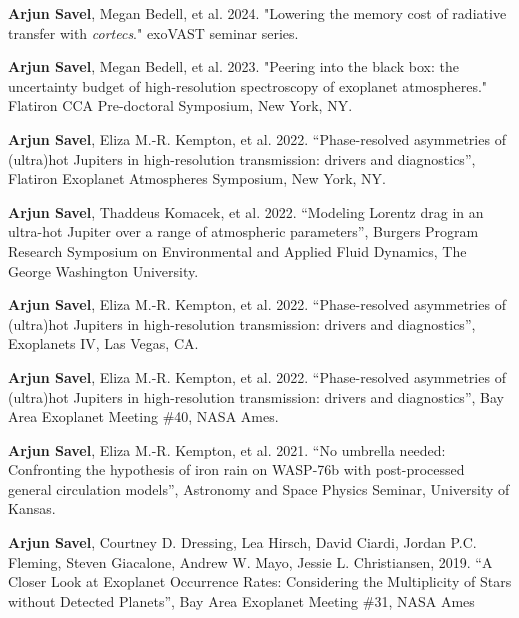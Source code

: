 \documentclass[letterpaper,10.5pt]{article}
\begin{document}
\begin{list}{}{\cvlist}
  \item[{\color{numcolor}\scriptsize10}] \textbf{Arjun Savel}, Megan Bedell, et al. 2024. "Lowering the memory cost of radiative transfer with \textit{cortecs}." exoVAST seminar series.
  

  \item[{\color{numcolor}\scriptsize9}] \textbf{Arjun Savel}, Megan Bedell, et al. 2023. "Peering into the black box: 
the uncertainty budget of high-resolution spectroscopy of exoplanet atmospheres." Flatiron CCA Pre-doctoral Symposium, New York, NY.

 \item[{\color{numcolor}\scriptsize8}] \textbf{Arjun Savel}, Eliza M.-R. Kempton, et al. 2022. ``Phase-resolved asymmetries of (ultra)hot Jupiters in high-resolution transmission: drivers and diagnostics'', Flatiron Exoplanet Atmospheres Symposium, New York, NY.

\item[{\color{numcolor}\scriptsize7}] \textbf{Arjun Savel}, Thaddeus Komacek, et al. 2022. ``Modeling Lorentz drag in an ultra-hot Jupiter over a range of atmospheric parameters'', Burgers Program Research Symposium on Environmental and Applied Fluid Dynamics, The George Washington University.

     \item[{\color{numcolor}\scriptsize6}] \textbf{Arjun Savel}, Eliza M.-R. Kempton, et al. 2022. ``Phase-resolved asymmetries of (ultra)hot Jupiters in high-resolution transmission: drivers and diagnostics'', Exoplanets IV, Las Vegas, CA.


   \item[{\color{numcolor}\scriptsize5}] \textbf{Arjun Savel}, Eliza M.-R. Kempton, et al. 2022. ``Phase-resolved asymmetries of (ultra)hot Jupiters in high-resolution transmission: drivers and diagnostics'', Bay Area Exoplanet Meeting \#40, NASA Ames.


\item[{\color{numcolor}\scriptsize4}] \textbf{Arjun Savel}, Eliza M.-R. Kempton, et al. 2021. ``No umbrella needed: Confronting the hypothesis of iron rain on WASP-76b with post-processed general circulation models'', Astronomy and Space Physics Seminar, University of Kansas.



\item[{\color{numcolor}\scriptsize3}] \textbf{Arjun Savel}, Courtney D. Dressing, Lea Hirsch, David Ciardi, Jordan P.C. Fleming, Steven Giacalone, Andrew W. Mayo, Jessie L. Christiansen, 2019. “A Closer Look at Exoplanet Occurrence Rates: Considering the Multiplicity of Stars without Detected Planets”, Bay Area Exoplanet Meeting \#31, NASA Ames


\end{list}
\end{document}
